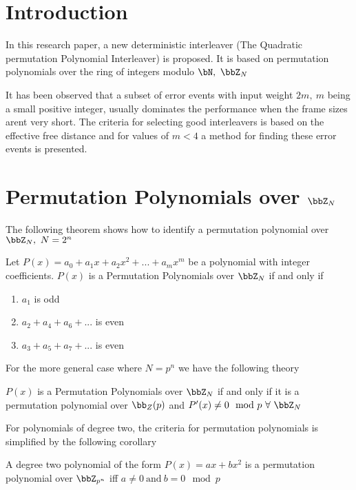 \documentclass[11pt, oneside, dvipdfmx]{book}
\begin{document}
\section{Introduction}
In this research paper, a new deterministic interleaver (The Quadratic permutation Polynomial Interleaver) is proposed. It is based on permutation polynomials over the ring of integers modulo $\bN,~\bbZ_N$

It has been observed that a subset of error events with input
weight $2m,~m$ being a small positive integer, usually dominates
the performance when the frame sizes arent very short. The criteria for selecting good interleavers is based on the effective free distance and for values of $m<4$ a method for finding these error events is presented.

\section{Permutation Polynomials over $\bbZ_N$}
The following theorem shows how to identify a permutation polynomial over $\bbZ_N,~N=2^n$

\begin{MyTheorem}
Let $P(x)=a_0+a_1x+a_2x^2+...+a_mx^m$ be a polynomial with integer coefficients. $P(x)$ is a Permutation Polynomials over $\bbZ_N$ if and only if 
\begin{enumerate}
\item $a_1$ is odd

\item $a_2+a_4+a_6+...$ is even

\item $a_3+a_5+a_7+...$ is even
\end{enumerate}
\end{MyTheorem}

For the more general case where $N=p^n$ we have the following theory
\begin{MyTheorem}
 $P(x)$ is a Permutation Polynomials over $\bbZ_N$ if and only if 
it is a permutation polynomial over $\bb_Z(p)$ and $P'(x) \neq 0 \mod{ p} ~\forall ~\bbZ_N$
\end{MyTheorem}

For polynomials of degree two, the criteria for permutation polynomials is simplified by the following corollary

\begin{corollary}
A degree two polynomial of the form $P(x) =ax+bx^2$ is a permutation polynomial over $\bbZ_{p^n}$ iff $a \neq 0 ~\text{and} ~ b=0 \mod p$
\end{corollary}
\end{document}
